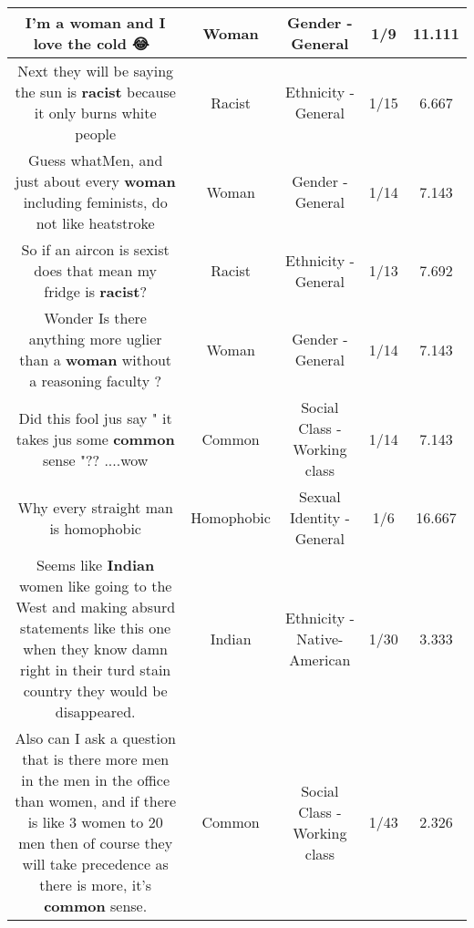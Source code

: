 \documentclass[11pt]{article}
\newlength\mylength
\begin{document}
\begin{center}
\begin{longtable}{|C{.65\mylength}|C{.30\mylength}|C{.12\mylength}|C{.12\mylength}|C{.12\mylength}|}
  \small I'm a \textbf{woman} and I love the cold 😂🤷‍♀️\normalsize   & Woman & Gender - General & 1/9 & 11.111 \\  \hline
  \small Next they will be saying the sun is \textbf{racist} because it only burns white people\normalsize   & Racist & Ethnicity - General & 1/15 & 6.667 \\  \hline
  \small Guess whatMen, and just about every \textbf{woman} including feminists, do not like heatstroke\normalsize   & Woman & Gender - General & 1/14 & 7.143 \\  \hline
  \small So if an aircon is sexist does that mean my fridge is \textbf{racist}?\normalsize   & Racist & Ethnicity - General & 1/13 & 7.692 \\  \hline
  \small Wonder Is there anything more uglier than a \textbf{woman} without a reasoning faculty ?\normalsize   & Woman & Gender - General & 1/14 & 7.143 \\  \hline
  \small Did this fool jus say " it takes jus some \textbf{common} sense "?? ....wow\normalsize   & Common & Social Class - Working class & 1/14 & 7.143 \\  \hline
  \small Why every straight man is homophobic\normalsize   & Homophobic & Sexual Identity - General & 1/6 & 16.667 \\  \hline
  \small Seems like \textbf{Indian} women like going to the West and making absurd statements like this one when they know damn right in their turd stain country they would be disappeared.\normalsize   & Indian & Ethnicity - Native-American & 1/30 & 3.333 \\  \hline
  \small Also can I ask a question that is there more men in the men in the office than women, and if there is like 3 women to 20 men then of course they will take precedence as there is more, it's \textbf{common} sense.\normalsize   & Common & Social Class - Working class & 1/43 & 2.326 \\  \hline

\end{longtable}
\end{center}
\end{document}
